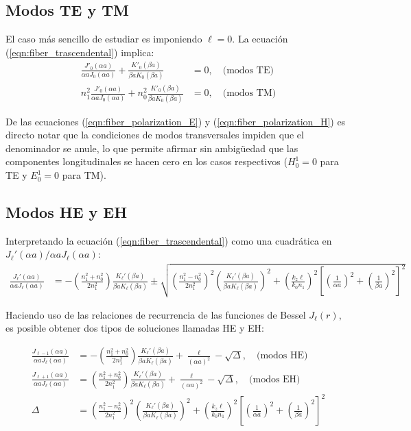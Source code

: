 \subsection{Modos TE y TM}
El caso más sencillo de estudiar es imponiendo $\ell = 0$. La ecuación (\ref{eqn:fiber_trascendental}) implica:
\begin{align*}
	\frac{J'_{0}(\alpha a)}{\alpha a J_0(\alpha a)} + \frac{K'_0(\beta a)}{\beta a K_0(\beta a)}&=  0, \quad \text{(modos TE)}
	\\
	n_1^2\frac{J'_{0}(\alpha a)}{\alpha a J_0(\alpha a)} + n_0^2 \frac{K'_0(\beta a)}{\beta a K_0(\beta a)} &= 0, \quad \text{(modos TM)}
\end{align*}

De las ecuaciones (\ref{eqn:fiber_polarization_E}) y (\ref{eqn:fiber_polarization_H}) es directo notar que la condiciones de modos transversales impiden que el denominador se anule, lo que permite afirmar sin ambigüedad que las componentes longitudinales se hacen cero en los casos respectivos ($H_0^1 = 0$ para TE y $E_0^1 = 0$ para TM).


\subsection{Modos HE y EH}
Interpretando la ecuación (\ref{eqn:fiber_trascendental}) como una cuadrática en $J_\ell'(\alpha a)/\alpha a J_\ell(\alpha a)$:
\begin{align*}
	\frac{J_\ell'(\alpha a)}{\alpha a J_\ell(\alpha a)} &= -\left(\frac{n_1^2+n_0^2}{2n_1^2}\right) \frac{K_\ell'(\beta a)}{\beta a K_\ell(\beta a)}\pm\sqrt{\left(\frac{n_1^2-n_0^2}{2n_1^2}\right)^2\left(\frac{K_\ell'(\beta a)}{\beta a K_\ell(\beta a)}\right)^2+ \left( \frac{ k_z \ell}{ k_0 n_1} \right)^2\left[ \left(\frac{1}{\alpha a}\right)^2 + \left(\frac{1}{\beta a}\right)^2 \right]^2 }
\end{align*}

Haciendo uso de las relaciones de recurrencia de las funciones de Bessel $J_\ell(r)$,  es posible obtener dos tipos de soluciones llamadas HE y EH:

\begin{align}
		\frac{J_{\ell-1}(\alpha a)}{\alpha a J_\ell(\alpha a)} &= -\left(\frac{n_1^2+n_0^2}{2n_1^2}\right) \frac{K_\ell'(\beta a)}{\beta a K_\ell(\beta a)}+\frac{\ell}{(\alpha a)^2}-\sqrt{\Delta}, \quad \text{(modos HE)}
		\label{eqn:HE}
	\\
		\frac{J_{\ell+1}(\alpha a)}{\alpha a J_\ell(\alpha a)} &= \left(\frac{n_1^2+n_0^2}{2n_1^2}\right) \frac{K_\ell'(\beta a)}{\beta a K_\ell(\beta a)}+\frac{\ell}{(\alpha a)^2}-\sqrt{\Delta}, \quad \text{(modos EH)}
		\label{eqn:EH}
		\\
		\Delta &= \left(\frac{n_1^2-n_0^2}{2n_1^2}\right)^2\left(\frac{K_\ell'(\beta a)}{\beta a K_\ell(\beta a)}\right)^2+ \left( \frac{ k_z \ell}{ k_0 n_1} \right)^2\left[ \left(\frac{1}{\alpha a}\right)^2 + \left(\frac{1}{\beta a}\right)^2 \right]^2 \nonumber
\end{align}




